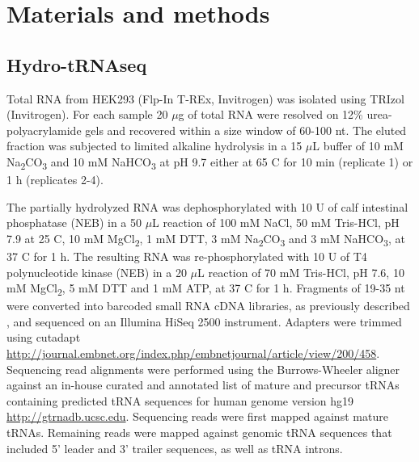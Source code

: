 \documentclass[12pt]{rockefeller}
\newcommand{\sub}[1]{\textsubscript{#1}}
\renewcommand{\deg}{\textdegree}
\begin{document}
\chapter{Materials and methods}

\section{Hydro-tRNAseq}
Total RNA from HEK293 (Flp-In T-REx, Invitrogen) was isolated using TRIzol (Invitrogen). For each sample 20 $\mu$g of total RNA were resolved on 12\% urea-polyacrylamide gels and recovered within a size window of 60-100 nt. The eluted fraction was subjected to limited alkaline hydrolysis in a 15 $\mu$L buffer of 10 mM Na\textsubscript{2}CO\textsubscript{3} and 10 mM NaHCO\textsubscript{3} at pH 9.7 either at 65 \deg C for 10 min (replicate 1) or 1 h (replicates 2-4).

The partially hydrolyzed RNA was dephosphorylated with 10 U of calf intestinal phosphatase (NEB) in a 50 $\mu$L reaction of 100 mM NaCl, 50 mM Tris-HCl, pH 7.9 at 25 \deg C, 10 mM MgCl\sub{2}, 1 mM DTT, 3 mM Na\sub{2}CO\sub{3} and 3 mM NaHCO\sub{3}, at 37 \deg C for 1 h. The resulting RNA was re-phosphorylated with 10 U of T4 polynucleotide kinase (NEB) in a 20 $\mu$L reaction of 70 mM Tris-HCl, pH 7.6, 10 mM MgCl\sub{2}, 5 mM DTT and 1 mM ATP, at 37 \deg C for 1 h. Fragments of 19-35 nt were converted into barcoded small RNA cDNA libraries, as previously described \cite{Hafner:2012eaa}, and sequenced on an Illumina HiSeq 2500 instrument. Adapters were trimmed using cutadapt \url{http://journal.embnet.org/index.php/embnetjournal/article/view/200/458}. Sequencing read alignments were performed using the Burrows-Wheeler aligner against an in-house curated and annotated list of mature and precursor tRNAs containing predicted tRNA sequences for human genome version hg19 \newline \url{http://gtrnadb.ucsc.edu}. Sequencing reads were first mapped against mature tRNAs. Remaining reads were mapped against genomic tRNA sequences that included 5’ leader and 3’ trailer sequences, as well as tRNA introns.
\end{document}

